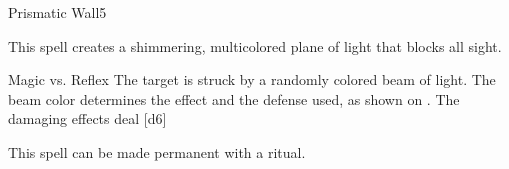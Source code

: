 \begin{spellsection}{Prismatic Wall}{5}
    \begin{spellheader}
    \end{spellheader}
    \begin{spellcontent}
        \begin{spelltargetinginfo}
        \end{spelltargetinginfo}
        \begin{spelleffects}
            \spelleffect This spell creates a shimmering, multicolored plane of light that blocks all sight.
            \spelldur \durshort \dismissable
        \end{spelleffects}
    \end{spellcontent}
    \begin{spellsubcontent}
        \begin{spelltargetinginfo}
        \end{spelltargetinginfo}
        \begin{spelleffects}
            \begin{spellattack}{Magic vs. Reflex}
                \spellspecial The target is struck by a randomly colored beam of light. The beam color determines the effect and the defense used, as shown on . The damaging effects deal [d6]
            \end{spellattack}
        \end{spelleffects}
    \end{spellsubcontent}
    \begin{spellfooter}
        \spellnotes This spell can be made permanent with a  ritual.
        \miscastexplode
    \end{spellfooter}
\end{spellsection}


